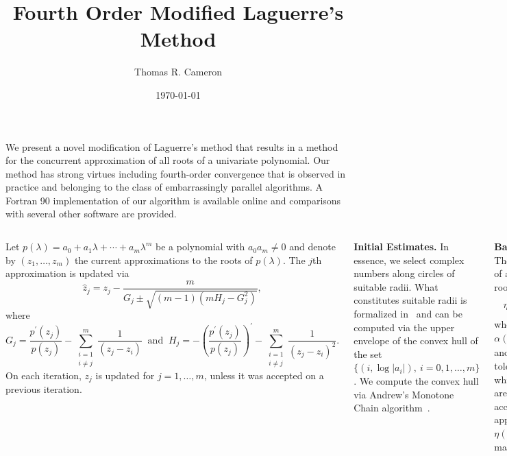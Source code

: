 \documentclass[20 pt, a0paper, portrait]{tikzposter}
\title{Fourth Order Modified Laguerre's Method}
\author{Thomas R. Cameron}
\date{\today}
\institute{Mathematics and Computer Science Department, Davidson College}
\begin{document}
 
\maketitle

{
We present a novel modification of Laguerre's method that results in a method for the concurrent approximation of all roots of a univariate polynomial. Our method has strong virtues including fourth-order convergence that is observed in practice and belonging to the class of embarrassingly parallel algorithms. A Fortran 90 implementation of our algorithm is available online and comparisons with several other software are provided. 
}

\begin{columns}
	{
		Let $p(\lambda)=a_{0}+a_{1}\lambda+\cdots+a_{m}\lambda^{m}$ be a polynomial with $a_{0}a_{m}\neq 0$ and denote by $(z_{1},\ldots,z_{m})$ the current approximations to the roots of $p(\lambda)$. The $j$th approximation is updated via
		\begin{equation}
		\hat{z}_{j}=z_{j}-\frac{m}{G_{j}\pm\sqrt{(m-1)(mH_{j}-G_{j}^{2})}},
		\end{equation}
		where 
		\begin{equation}
		G_{j}=\frac{p^{'}(z_{j})}{p(z_{j})}-\sum_{\substack{i=1\\i\neq j}}^{m}\frac{1}{(z_{j}-z_{i})}~\text{ and }~H_{j}=-\left(\frac{p^{'}(z_{j})}{p(z_{j})}\right)^{'}-\sum_{\substack{i=1\\i\neq j}}^{m}\frac{1}{(z_{j}-z_{i})^{2}}.
		\end{equation}
		On each iteration, $z_{j}$ is updated for $j=1,\ldots,m$, unless it was accepted on a previous iteration.
		
	\textbf{Initial Estimates.} In essence, we select complex numbers along circles of suitable radii. What constitutes suitable radii is formalized in~\cite{Bini1996} and can be computed via the upper envelope of the convex hull of the set $\{(i,\log|a_{i}|),~i=0,1,\ldots,m\}$. We compute the convex hull via Andrew's Monotone Chain algorithm~\cite{Andrew1979}.
	
	\textbf{Backward Error.} The backward error of an approximate root $\xi$ is given by
	\begin{equation}
	\eta(\xi)=\frac{|p(\xi)|}{\alpha(\xi)},
	\end{equation}
	where $\alpha(\xi) = \sum_{i=0}^{m}|e_{i}||\xi|^{i}$ and $e_{i}$ represent tolerances against which perturbations are measured. We accept a root approximation $\xi$ if $\eta(\xi)<\mu$, where $\mu$ is machine precision. 
	
}
\end{columns}
\end{document}

